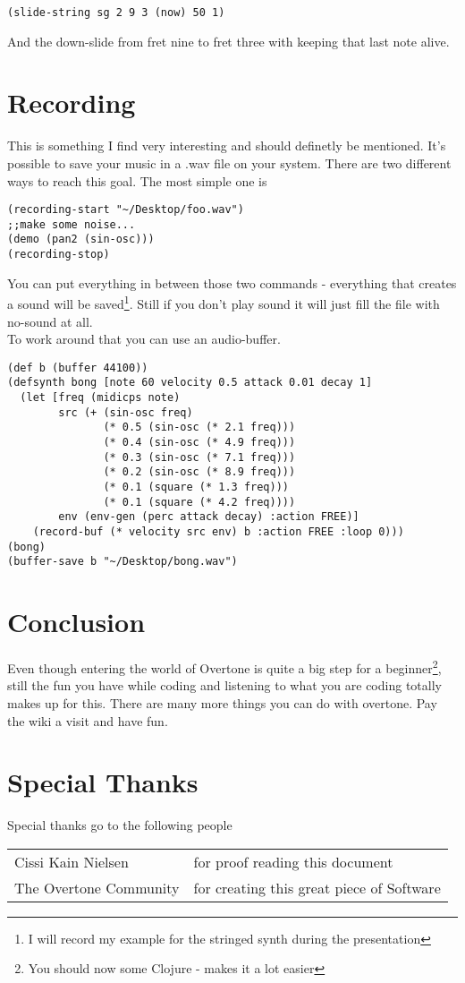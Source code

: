 \begin{lstlisting}
(slide-string sg 2 9 3 (now) 50 1)
\end{lstlisting}
And the down-slide from fret nine to fret three with keeping that last note alive.

\chapter{Recording}
This is something I find very interesting and should definetly be mentioned. It's possible to save your music in a .wav file on your system.
There are two different ways to reach this goal. The most simple one is
\begin{lstlisting}
(recording-start "~/Desktop/foo.wav")
;;make some noise...
(demo (pan2 (sin-osc)))
(recording-stop)
\end{lstlisting}
You can put everything in between those two commands - everything that creates a sound will be saved\footnote{I will record my example for the stringed synth during the presentation}.
Still if you don't play sound it will just fill the file with no-sound at all.\\

To work around that you can use an audio-buffer.

\begin{lstlisting}
(def b (buffer 44100))
(defsynth bong [note 60 velocity 0.5 attack 0.01 decay 1] 
  (let [freq (midicps note) 
        src (+ (sin-osc freq) 
               (* 0.5 (sin-osc (* 2.1 freq))) 
               (* 0.4 (sin-osc (* 4.9 freq))) 
               (* 0.3 (sin-osc (* 7.1 freq))) 
               (* 0.2 (sin-osc (* 8.9 freq))) 
               (* 0.1 (square (* 1.3 freq))) 
               (* 0.1 (square (* 4.2 freq)))) 
        env (env-gen (perc attack decay) :action FREE)] 
    (record-buf (* velocity src env) b :action FREE :loop 0))) 
(bong)
(buffer-save b "~/Desktop/bong.wav") 
\end{lstlisting}

\chapter{Conclusion}
\label{chap:end}
Even though entering the world of Overtone is quite a big step for a beginner\footnote{You should now some Clojure - makes it a lot easier}, still the fun you have while coding and listening to what you are coding totally makes up for this.
There are many more things you can do with overtone. Pay the wiki\cite{ow} a visit and have fun.

\chapter{Special Thanks}
Special thanks go to the following people

\begin{tabular}{l l}
Cissi Kain Nielsen & for proof reading this document\\
The Overtone Community & for creating this great piece of Software\\
\end{tabular}